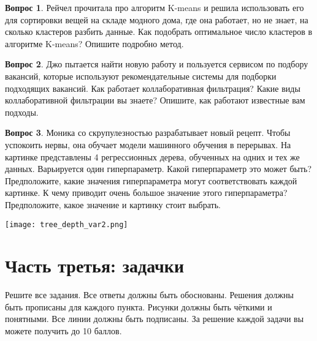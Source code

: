 \documentclass[12pt]{article}
\theoremstyle{definition}
\newtheorem{question}{Вопрос}
\begin{document}
\newpage


\begin{question}
Рейчел прочитала про алгоритм K-means и решила использовать его для сортировки вещей на складе модного дома, где она работает, но не знает, на сколько кластеров разбить данные. Как подобрать оптимальное число кластеров в алгоритме K-means? Опишите подробно метод.

\end{question}


\vspace{10cm} 

\begin{question}
Джо пытается найти новую работу и пользуется сервисом по подбору вакансий, которые используют рекомендательные системы для подборки подходящих вакансий.
Как работает коллаборативная фильтрация? Какие виды коллаборативной фильтрации вы знаете? Опишите, как работают известные вам подходы.

\end{question}
\newpage 

\begin{question}
Моника со скрупулезностью разрабатывает новый рецепт. Чтобы успокоить нервы, она обучает модели машинного обучения в перерывах. На картинке представлены 4 регрессионных дерева, обученных на одних и тех же данных. Варьируется один гиперпараметр. Какой гиперпараметр это может быть? Предположите, какие значения гиперпараметра могут соответствовать каждой картинке. К чему приводит очень большое значение этого гиперпараметра? Предположите, какое значение и картинку стоит выбрать.
\begin{center}
    \texttt{[image: tree\_depth\_var2.png]}
\end{center}
\end{question}




\newpage 


\section*{Часть третья: задачки}

Решите все задания. Все ответы должны быть обоснованы. Решения должны быть прописаны для каждого пункта. Рисунки должны быть чёткими и понятными. Все линии должны быть подписаны. За решение каждой задачи вы можете получить до 10 баллов.
\end{document}
